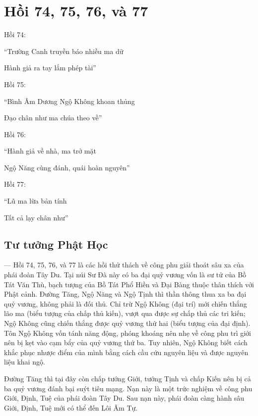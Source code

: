 \chapter{Hồi 74, 75, 76, và 77} %
\label{cha:hoi_74_75}

Hồi 74:

\begin{itshape}
``Trường Canh truyền báo nhiều ma dữ

Hành giả ra tay lắm phép tài''
\end{itshape}

Hồi 75:

\begin{itshape}
``Bình Âm Dương Ngộ Không khoan thủng

Đạo chân như ma chúa theo về''
\end{itshape}

Hồi 76:

\begin{itshape}
``Hành giả về nhà, ma trở mặt

Ngộ Năng cùng đánh, quái hoàn nguyên''
\end{itshape}

Hồi 77:

\begin{itshape}
``Lũ ma lừa bản tính

Tất cả lạy chân như''
\end{itshape}

\section{Tư tưởng Phật Học} %
\label{sec:74_75_phat_hoc}

— Hồi 74, 75, 76, và 77 là các hồi thử thách về công phu giải thoát sâu xa của phái đoàn Tây Du. Tại núi Sư Đà này có ba đại quỷ vương vốn là sư tử của Bồ Tát Văn Thù, bạch tượng của Bồ Tát Phổ Hiền và Đại Bàng thuộc thân thích với Phật cảnh. Đường Tăng, Ngộ Năng và Ngộ Tịnh thì thần thông thua xa ba đại quỷ vương, không phải là đối thủ. Chỉ trừ Ngộ Không (đại trí) mới chiến thắng lão ma (biểu tượng của chấp thủ kiến), vượt qua được sự chấp thủ các tri kiến; Ngộ Không cũng chiến thắng được quỷ vương thứ hai (biểu tượng của đại định). Tôn Ngộ Không vốn tánh năng động, phóng khoáng nên nhẹ về công phu trì giới nên bị kẹt vào cạm bẩy của quỷ vương thứ ba. Tuy nhiên, Ngộ Không biết cách khắc phục nhược điểm của mình bằng cách cầu cứu nguyên liệu và được nguyên liệu khai ngộ.

Đường Tăng thì tại đây còn chấp tướng Giới, tướng Tịnh và chấp Kiến nên bị cả ba quỷ vương đánh bại suýt tiêu mạng. Nạn này là một trức nghiệm về công phu Giới, Định, Tuệ của phái đoàn Tây Du. Sau nạn này, phái đoàn càng hành sâu Giới, Định, Tuệ mới có thể đến Lôi Âm Tự.

